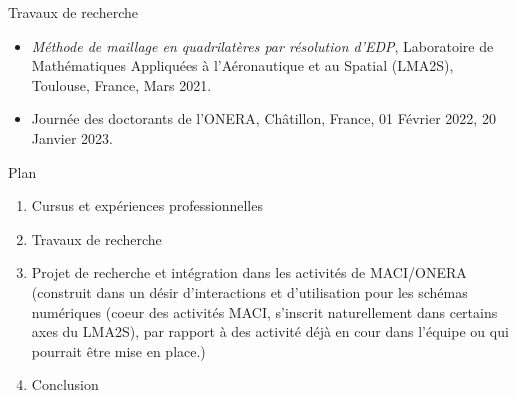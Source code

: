 \documentclass[compress,10pt,aspectratio=169]{beamer}
\begin{document}
\begin{frame}{Travaux de recherche}
{\begin{itemize}
\item \textit{Méthode de maillage en quadrilatères par résolution d’EDP}, Laboratoire de Mathématiques Appliquées à l’Aéronautique et au Spatial (LMA2S), Toulouse, France, Mars 2021.\\\vspace{0.2cm}

\item Journée des doctorants de l’ONERA, Châtillon, France, 01 Février 2022, 20 Janvier 2023.\\\vspace{0.2cm}
\end{itemize}
}
\end{frame}


\begin{frame}{Plan}
\vspace{-0.4cm}
\begin{enumerate}
\color{onera}
\item {\color{onera_gray}Cursus et expériences professionnelles}\\\vspace{0.5cm}
\item {\color{onera_gray}Travaux de recherche} \\\vspace{0.5cm}
\item {\color{onera}Projet de recherche et intégration dans les activités de MACI/ONERA} {\color{onera_gray} \small (construit dans un désir d'interactions et d'utilisation pour les schémas numériques (coeur des activités MACI, s'inscrit naturellement dans certains axes du LMA2S), par rapport à des activité déjà en cour dans l'équipe ou qui pourrait être mise en place.)}\\\vspace{0.5cm}
\item {\color{onera_gray}Conclusion}
\end{enumerate}
\end{frame}
\end{document}
